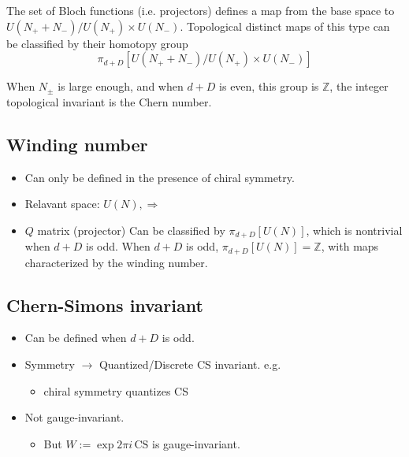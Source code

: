 \documentclass{article}
\begin{document}
\begin{thm}
    The set of Bloch functions (i.e. projectors) defines a map from the
    base space to $U(N_+ +N_-)/U(N_+)\times U(N_-)$. Topological
    distinct maps of this type can be classified by their homotopy
    group
    \begin{equation}
        \pi_{d+D}[U(N_+ +N_-)/U(N_+)\times U(N_-)]
    \end{equation}
\end{thm}

When $N_\pm$ is large enough, and when $d+D$ is even, this group is
$\mathbb{Z}$, the integer topological invariant is the Chern number.

\subsection{Winding number}
\label{sec:Winding-number}
\begin{itemize}
    \item Can only be defined in the presence of chiral symmetry.
    \item Relavant space: $U(N), \Rightarrow$
    \item $Q$ matrix (projector) Can be classified by
        $\pi_{d+D}[U(N)]$, which is nontrivial when $d+D$ is odd. When
        $d+D$ is odd, $\pi_{d+D}[U(N)]=\mathbb{Z}$, with maps
        characterized by the winding number.
\end{itemize}

\subsection{Chern-Simons invariant}
\label{sec:Chern-Simons-invariant}
\begin{itemize}
    \item Can be defined when $d+D$ is odd.
    \item Symmetry $\rightarrow$ Quantized/Discrete CS invariant. e.g.
        \begin{itemize}
            \item chiral symmetry quantizes CS
        \end{itemize}
    \item Not gauge-invariant.
        \begin{itemize}
            \item But $W:= \exp{2\pi i \,\text{CS}}$ is gauge-invariant.
        \end{itemize}
\end{itemize}
\end{document}
